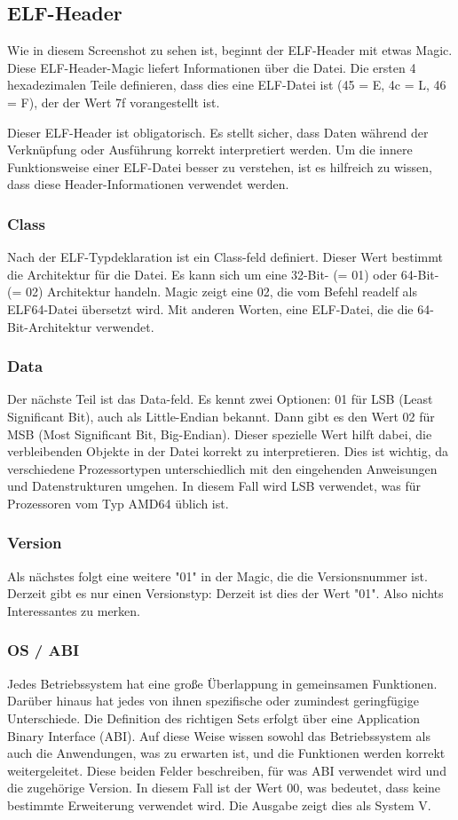 \subsection{ELF-Header}
Wie in diesem Screenshot zu sehen ist, beginnt der ELF-Header mit etwas Magic. Diese ELF-Header-Magic liefert Informationen über die Datei. Die ersten 4 hexadezimalen Teile definieren, dass dies eine ELF-Datei ist (45 = E, 4c = L, 46 = F), der der Wert 7f vorangestellt ist.
 
Dieser ELF-Header ist obligatorisch. Es stellt sicher, dass Daten während der Verknüpfung oder Ausführung korrekt interpretiert werden. Um die innere Funktionsweise einer ELF-Datei besser zu verstehen, ist es hilfreich zu wissen, dass diese Header-Informationen verwendet werden.
 
\subsubsection{Class}
Nach der ELF-Typdeklaration ist ein Class-feld definiert. Dieser Wert bestimmt die Architektur für die Datei. Es kann sich um eine 32-Bit- (= 01) oder 64-Bit- (= 02) Architektur handeln. Magic zeigt eine 02, die vom Befehl readelf als ELF64-Datei übersetzt wird. Mit anderen Worten, eine ELF-Datei, die die 64-Bit-Architektur verwendet.

\subsubsection{Data}
Der nächste Teil ist das Data-feld. Es kennt zwei Optionen: 01 für LSB (Least Significant Bit), auch als Little-Endian bekannt. Dann gibt es den Wert 02 für MSB (Most Significant Bit, Big-Endian). Dieser spezielle Wert hilft dabei, die verbleibenden Objekte in der Datei korrekt zu interpretieren. Dies ist wichtig, da verschiedene Prozessortypen unterschiedlich mit den eingehenden Anweisungen und Datenstrukturen umgehen. In diesem Fall wird LSB verwendet, was für Prozessoren vom Typ AMD64 üblich ist.

\subsubsection{Version}
Als nächstes folgt eine weitere "01" in der Magic, die die Versionsnummer ist. Derzeit gibt es nur einen Versionstyp: Derzeit ist dies der Wert "01". Also nichts Interessantes zu merken.

\subsubsection{OS / ABI}
Jedes Betriebssystem hat eine große Überlappung in gemeinsamen Funktionen. Darüber hinaus hat jedes von ihnen spezifische oder zumindest geringfügige Unterschiede. Die Definition des richtigen Sets erfolgt über eine Application Binary Interface (ABI). Auf diese Weise wissen sowohl das Betriebssystem als auch die Anwendungen, was zu erwarten ist, und die Funktionen werden korrekt weitergeleitet. Diese beiden Felder beschreiben, für was ABI verwendet wird und die zugehörige Version. In diesem Fall ist der Wert 00, was bedeutet, dass keine bestimmte Erweiterung verwendet wird. Die Ausgabe zeigt dies als System V.

